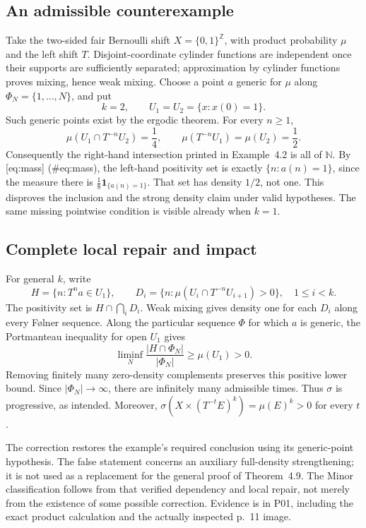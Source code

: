 \documentclass[10pt]{article}
\begin{document}
\subsection*{An admissible counterexample}
Take the two-sided fair Bernoulli shift \(X=\{0,1\}^{\mathbb Z}\), with product probability \(\mu\) and the left shift \(T\). Disjoint-coordinate cylinder functions are independent once their supports are sufficiently separated; approximation by cylinder functions proves mixing, hence weak mixing. Choose a point \(a\) generic for \(\mu\) along \(\Phi_N=\{1,\ldots,N\}\), and put \[k=2,\qquad U_1=U_2=\{x:x(0)=1\}.\] Such generic points exist by the ergodic theorem. For every \(n\geq1\), \[\mu(U_1\cap T^{-n}U_2)=\frac14,\qquad
 \mu(T^{-n}U_1)=\mu(U_2)=\frac12 .\] Consequently the right-hand intersection printed in Example 4.2 is all of \(\mathbb N\). By [eq:mass] (\#eq:mass), the left-hand positivity set is exactly \(\{n:a(n)=1\}\), since the measure there is \(\frac18\mathbf 1_{\{a(n)=1\}}\). That set has density \(1/2\), not one. This disproves the inclusion and the strong density claim under valid hypotheses. The same missing pointwise condition is visible already when \(k=1\).\par
\subsection*{Complete local repair and impact}
For general \(k\), write \[H=\{n:T^n a\in U_1\},\qquad
 D_i=\{n:\mu(U_i\cap T^{-n}U_{i+1})>0\},\quad 1\leq i<k.\] The positivity set is \(H\cap\bigcap_iD_i\). Weak mixing gives density one for each \(D_i\) along every Følner sequence. Along the particular sequence \(\Phi\) for which \(a\) is generic, the Portmanteau inequality for open \(U_1\) gives \[\liminf_N\frac{|H\cap\Phi_N|}{|\Phi_N|}\geq\mu(U_1)>0.\] Removing finitely many zero-density complements preserves this positive lower bound. Since \(|\Phi_N|\to\infty\), there are infinitely many admissible times. Thus \(\sigma\) is progressive, as intended. Moreover, \(\sigma(X\times(T^{-t}E)^k)=\mu(E)^k>0\) for every \(t\).\par
The correction restores the example’s required conclusion using its generic-point hypothesis. The false statement concerns an auxiliary full-density strengthening; it is not used as a replacement for the general proof of Theorem 4.9. The Minor classification follows from that verified dependency and local repair, not merely from the existence of some possible correction. Evidence is in P01, including the exact product calculation and the actually inspected p. 11 image.\par
\end{document}
